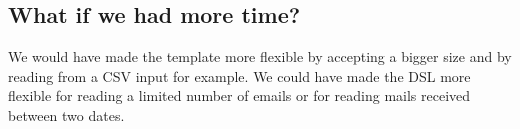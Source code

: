 \documentclass[a4paper, 11pt]{article}
\begin{document}
    \subsection{What if we had more time?}

    We would have made the template more flexible by accepting a bigger size
    and by reading from a CSV input for example. We could have made the DSL
    more flexible for reading a limited number of emails or for reading mails
    received between two dates. \newline
\end{document}
